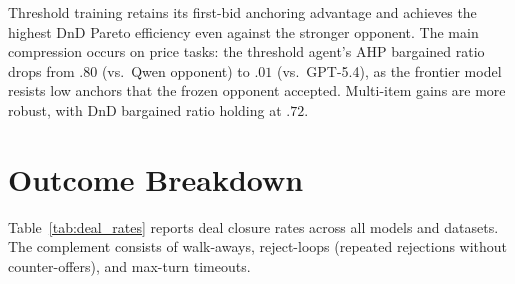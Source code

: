 \documentclass[11pt]{article}
\begin{document}
Threshold training retains its first-bid anchoring advantage and achieves the highest DnD Pareto efficiency even against the stronger opponent. The main compression occurs on price tasks: the threshold agent's AHP bargained ratio drops from $.80$ (vs.\ Qwen opponent) to $.01$ (vs.\ GPT-5.4), as the frontier model resists low anchors that the frozen opponent accepted. Multi-item gains are more robust, with DnD bargained ratio holding at $.72$.

\section{Outcome Breakdown}
\label{app:outcomes}

Table~\ref{tab:deal_rates} reports deal closure rates across all models and datasets. The complement consists of walk-aways, reject-loops (repeated rejections without counter-offers), and max-turn timeouts.
\end{document}
